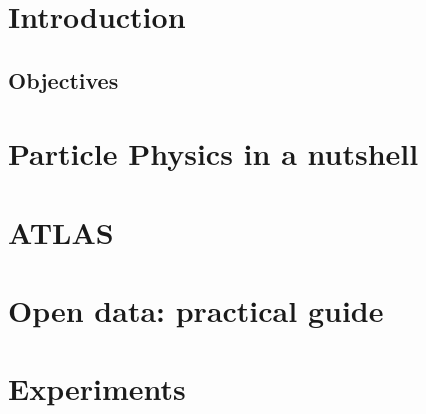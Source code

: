 \documentclass[11pt,fleqn]{book} %
\begin{document}


\chapter{Introduction}



\section{Objectives}
\label{sec:objectives} 



\chapter{Particle Physics in a nutshell}
\label{sec:particle_physics}


\chapter{ATLAS}
\label{sec:ATLAS}


\chapter{Open data: practical guide}
\label{sec:open_data}


\chapter{Experiments}
\label{sec:experiments}

\end{document}
